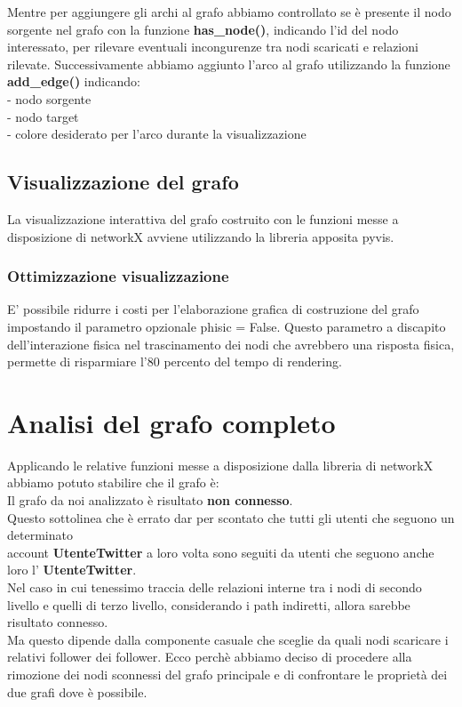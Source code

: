 \documentclass[a4paper,11pt]{report}
\begin{document}
Mentre per aggiungere gli archi al grafo abbiamo controllato se è presente il nodo sorgente nel grafo con la funzione \textbf{has\_node()}, indicando l'id del nodo interessato, per rilevare eventuali incongurenze tra nodi scaricati e relazioni rilevate. Successivamente abbiamo aggiunto l'arco al grafo utilizzando la funzione \textbf{add\_edge()} indicando:\\
- nodo sorgente\\
- nodo target \\
- colore desiderato per l'arco durante la visualizzazione\\

\subsection{Visualizzazione del grafo}
La visualizzazione interattiva del grafo costruito con le funzioni messe a disposizione di networkX avviene utilizzando la libreria apposita pyvis.
\subsubsection{Ottimizzazione visualizzazione}
E' possibile ridurre i costi per l'elaborazione grafica di costruzione del grafo impostando il parametro opzionale phisic = False. Questo parametro a discapito dell'interazione fisica nel trascinamento  dei nodi che avrebbero una risposta fisica, permette di risparmiare l'80 percento del tempo di rendering.

\pagebreak
\section{Analisi del grafo completo}
Applicando le relative funzioni messe a disposizione dalla libreria di networkX abbiamo potuto stabilire che il grafo è:\\
Il grafo da noi analizzato è risultato \textbf{non connesso}.\\
Questo sottolinea che è errato dar per scontato che tutti gli utenti che seguono un determinato \\account \textbf{UtenteTwitter} a loro volta sono seguiti da utenti che seguono anche loro l' \textbf{UtenteTwitter}. \newline \\Nel caso in cui tenessimo traccia delle relazioni interne tra i nodi di secondo livello e quelli di terzo livello, considerando i path indiretti, allora sarebbe risultato connesso.\\ Ma questo dipende dalla componente casuale che sceglie da quali nodi scaricare i relativi follower dei follower.\newline
Ecco perchè abbiamo deciso di procedere alla rimozione dei nodi sconnessi del grafo principale e di confrontare le proprietà dei due grafi dove è possibile.
\end{document}
